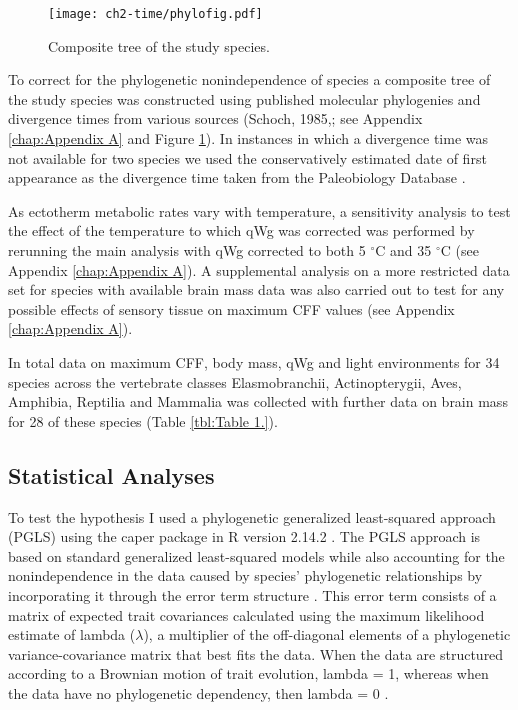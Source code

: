 \begin{figure}[h!]
  \centering
  \texttt{[image: ch2-time/phylofig.pdf]}%
  \caption[Figure 2.]{ Composite tree of the study species.}
  \label{fig:Figure 2.}
\end{figure}


To correct for the phylogenetic nonindependence of species a composite tree of the study species was constructed using published molecular phylogenies and divergence times from various sources \citep{schoch1985preliminary,janossy2011pleistocene,mercer2003effects,hedges2006timetree,wiens2006does,benton2007paleontological,murphy2007using,brown2008strong,li2008optimal,naro2008evolutionary,albert2009effect,lim2010phylogeny,little2010evolutionary,perelman2011molecular} (Schoch, 1985,; see Appendix \ref{chap:Appendix A} and Figure \ref{fig:Figure 2.}). In instances in which a divergence time was not available for two species we used the conservatively estimated date of first appearance as the divergence time taken from the Paleobiology Database \citep{alroy2008phanerozoic}.


As ectotherm metabolic rates vary with temperature, a sensitivity analysis to test the effect of the temperature to which qWg was corrected was performed by rerunning the main analysis with qWg corrected to both 5 $^{\circ}$C and 35 $^{\circ}$C (see Appendix \ref{chap:Appendix A}). A supplemental analysis on a more restricted data set for species with available brain mass data was also carried out to test for any possible effects of sensory tissue on maximum CFF values (see Appendix \ref{chap:Appendix A}).

In total data on maximum CFF, body mass, qWg and light environments for 34 species across the vertebrate classes Elasmobranchii, Actinopterygii, Aves, Amphibia, Reptilia and Mammalia was collected with further data on brain mass for 28 of these species (Table \ref{tbl:Table 1.}).

\subsection{Statistical Analyses}
To test the hypothesis I used a phylogenetic generalized least-squared approach (PGLS) using the caper package \citep{orme2011caper} in R version 2.14.2 \citep{RCran}. The PGLS approach is based on standard generalized least-squared models while also accounting for the nonindependence in the data caused by species' phylogenetic relationships by incorporating it through the error term structure \citep{pagel1999inferring,rohlf2001comparative}. This error term consists of a matrix of expected trait covariances calculated using the maximum likelihood estimate of lambda ($\lambda$), a multiplier of the off-diagonal elements of a phylogenetic variance-covariance matrix that best fits the data. When the data are structured according to a Brownian motion of trait evolution, lambda = 1, whereas when the data have no phylogenetic dependency, then lambda = 0 \citep{pagel1999inferring}.

